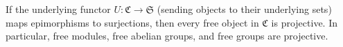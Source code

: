 If the underlying functor $U : \mathfrak{C} \to \mathfrak{S}$ (sending objects to their underlying sets) maps epimorphisms to surjections, then every free object in $\mathfrak{C}$ is projective. In particular, free modules, free abelian groups, and free groups are projective.
